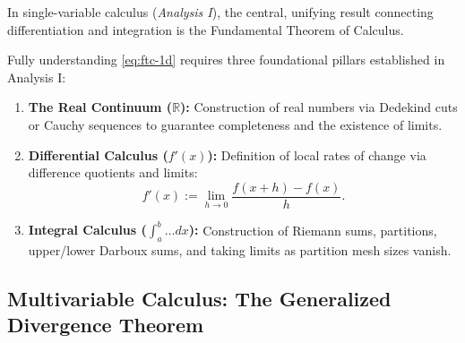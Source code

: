 \begin{math-stroke}
In single-variable calculus (\emph{Analysis I}), the central, unifying result connecting differentiation and integration is the Fundamental Theorem of Calculus.


\begin{explanation-of-steps}
Fully understanding \cref{eq:ftc-1d} requires three foundational pillars established in Analysis I:
\begin{enumerate}[label=\textbf{(\arabic*)}]
    \item \textbf{The Real Continuum ($\mathbb{R}$):} Construction of real numbers via Dedekind cuts or Cauchy sequences to guarantee completeness and the existence of limits.
    \item \textbf{Differential Calculus ($f'(x)$):} Definition of local rates of change via difference quotients and limits:
    \[
    f'(x) := \lim_{h \to 0} \frac{f(x+h) - f(x)}{h}.
    \]
    \item \textbf{Integral Calculus ($\int_a^b \dots dx$):} Construction of Riemann sums, partitions, upper/lower Darboux sums, and taking limits as partition mesh sizes vanish.
\end{enumerate}
\end{explanation-of-steps}
\end{math-stroke}

\begin{ai-global-state-checkpoint-invisible-content}
\end{ai-global-state-checkpoint-invisible-content}

\subsection{Multivariable Calculus: The Generalized Divergence Theorem}

